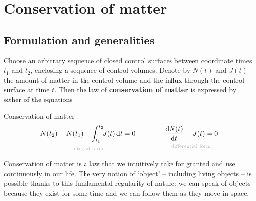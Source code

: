\documentclass[a4paper,12pt,%
onecolumn,oneside,titlepage,%
british%
]{memoir}
\newcommand*{\di}{\mathrm{d}}%
\renewcommand*{\|}[1][]{\nonscript\:#1\vert\nonscript\:\mathopen{}}
\newcommand*{\yN}{N}
\newcommand*{\yJ}{J}
\begin{document}
\printpagenotes*
\clearpage

\chapter{Conservation of matter}
\label{cha:cons_matter}

\section{Formulation and generalities}
\label{sec:cons_matter_formulation}

Choose an arbitrary sequence of closed control surfaces between coordinate times $t_{1}$ and $t_{2}$, enclosing a sequence of control volumes. Denote by $\yN(t)$ and $\yJ(t)$ the amount of matter in the control volume and the influx through the control surface at time $t$. Then the law of \textbf{conservation of matter} is expressed by either of the equations
\begin{definition}{Conservation of matter}
  \begin{equation}
    \label{eq:cons_matter}
    \begin{gathered}
      \underbracket[0pt]{\yN(t_{2}) - \yN(t_{1}) - \int_{t_{1}}^{t_{2}}\!\!\yJ(t)\,\di t = 0}_{\mathclap{\text{\color{grey}integral form}}}
      \qquad%
      \qquad
      \underbracket[0pt]{\frac{\di\yN(t)}{\di t} - \yJ(t) = 0}_{\mathclap{\text{\color{grey}differential form}}}
    \end{gathered}
  \end{equation}
\end{definition}

Conservation of matter is a law that we intuitively take for granted and use continuously in our life. The very notion of \enquote*{object} -- including living objects -- is possible thanks to this fundamental regularity of nature: we can speak of objects because they exist for some time and we can follow them as they move in space. %
\end{document}
